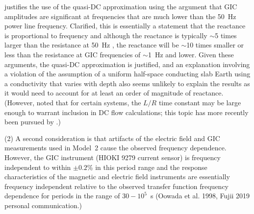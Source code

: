 \documentclass[draft,linenumbers]{agujournal2018}
\providecommand{\DIFdelbegin}{} %
\begin{document}
\cite{Lehtinen1985} justifies the use of the quasi-DC approximation using the argument that GIC amplitudes are significant at frequencies that are much lower than the 50~Hz power line frequency. Clarified, this is essentially a statement that the reactance is proportional to frequency and although the reactance is typically $\sim$5 times larger than the resistance at 50~Hz \citep{Purchala2005}, the reactance will be $\sim$10 times smaller or less than the resistance at GIC frequencies of $\sim$1~Hz and lower. Given these arguments, the quasi-DC approximation is justified, and an explanation involving a violation of the assumption of a uniform half-space conducting slab Earth using a conductivity that varies with depth also seems unlikely to explain the results as it would need to account for at least an order of magnitude of reactance. (However, \cite{Boteler1994} noted that for certain systems, the $L/R$ time constant may be large enough to warrant inclusion in DC flow calculations; this topic has more recently been pursued by \cite{Oyedokun2013a}.)

(2) A second consideration is that artifacts of the electric field and GIC measurements used in Model~2 cause the observed frequency dependence. However, the GIC instrument (HIOKI 9279 current sensor) is frequency independent to within $\pm 0.2$\% in this period range and the response characteristics of the magnetic and electric field instruments are essentially frequency independent relative to the observed transfer function frequency dependence for periods in the range of $30-10^{5}$~s (Oowada et al. 1998, Fujii 2019 personal communication.)

\DIFdelbegin %

\end{document}
